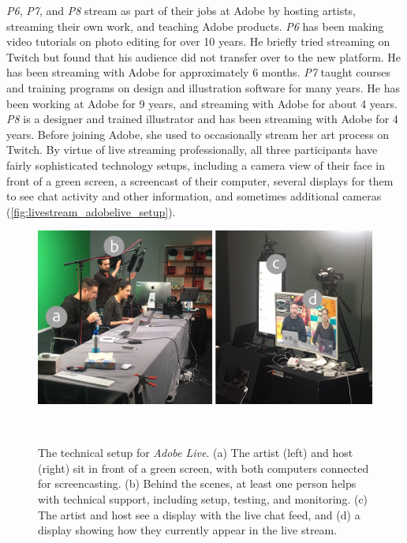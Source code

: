 \textit{P6}, \textit{P7}, and \textit{P8} stream as part of their jobs at Adobe by hosting artists, streaming their own work, and teaching Adobe products.
\textit{P6} has been making video tutorials on photo editing for over 10 years. He briefly tried streaming on Twitch but found that his audience did not transfer over to the new platform. He has been streaming with Adobe for approximately 6 months. \textit{P7} taught courses and training programs on design and illustration software for many years. He has been working at Adobe for 9 years, and streaming with Adobe for about 4 years. 
\textit{P8} is a designer and trained illustrator and has been streaming with Adobe for 4 years. Before joining Adobe, she used to occasionally stream her art process on Twitch. By virtue of live streaming professionally, all three participants have fairly sophisticated technology setups, including a camera view of their face in front of a green screen, a screencast of their computer, several displays for them to see chat activity and other information, and sometimes additional cameras (\autoref{fig:livestream_adobelive_setup}). 

\begin{figure}[t!]
\centering
  \includegraphics[width=0.8\columnwidth]{liveclips/figures/adobelive_setup.png}
  \caption[The technical setup for \textit{Adobe Live}.]{The technical setup for \textit{Adobe Live}. (a) The artist (left) and host (right) sit in front of a green screen, with both computers connected for screencasting. (b) Behind the scenes, at least one person helps with technical support, including setup, testing, and monitoring. (c) The artist and host see a display with the live chat feed, and (d) a display showing how they currently appear in the live stream. }~\label{fig:livestream_adobelive_setup}
  \vspace{-0.2in}
\end{figure}

